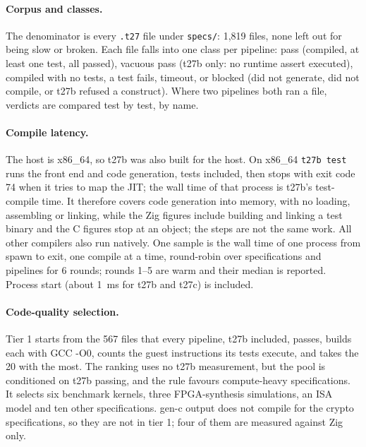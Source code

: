 \documentclass[11pt,a4paper]{article}
\begin{document}
\paragraph{Corpus and classes.}
The denominator is every \texttt{.t27} file under \texttt{specs/}: 1,819
files, none left out for being slow or broken. Each file falls into one
class per pipeline: pass (compiled, at least one test, all passed),
vacuous pass (t27b only: no runtime assert executed), compiled with no
tests, a test fails, timeout, or blocked (did not generate, did not
compile, or t27b refused a construct). Where two pipelines both ran a
file, verdicts are compared test by test, by name.

\paragraph{Compile latency.}
The host is x86\_64, so t27b was also built for the host. On x86\_64
\texttt{t27b test} runs the front end and code generation, tests included,
then stops with exit code 74 when it tries to map the JIT; the wall time of
that process is t27b's test-compile time. It therefore covers code
generation into memory, with no loading, assembling or linking, while
the Zig figures include building and linking a test binary and the C
figures stop at an object; the steps are not the same work. All other
compilers also run natively. One sample is the wall time of one process from spawn to exit,
one compile at a time, round-robin over specifications and pipelines for
6 rounds; rounds 1--5 are warm and their median is reported. Process start
(about 1~ms for t27b and t27c) is included.

\paragraph{Code-quality selection.}
Tier 1 starts from the 567 files that every pipeline, t27b included,
passes, builds each with GCC -O0, counts the guest instructions its tests
execute, and takes the 20 with the most. The ranking uses no t27b
measurement, but the pool is conditioned on t27b passing, and the rule
favours compute-heavy specifications. It selects six
benchmark kernels, three FPGA-synthesis simulations, an ISA model and ten
other specifications. gen-c output does not compile for the crypto
specifications, so they are not in tier 1; four of them are measured
against Zig only.
\end{document}
